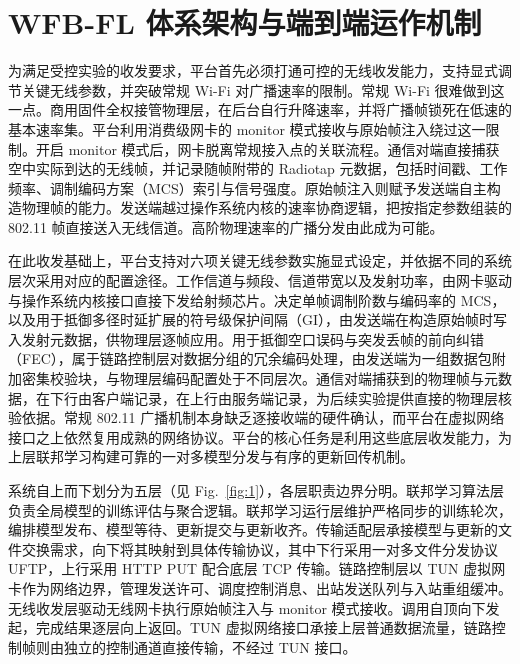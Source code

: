 \section{WFB-FL 体系架构与端到端运作机制}
\label{sec:3}

为满足受控实验的收发要求，平台首先必须打通可控的无线收发能力，支持显式调节关键无线参数，并突破常规 Wi-Fi 对广播速率的限制。常规 Wi-Fi 很难做到这一点。商用固件全权接管物理层，在后台自行升降速率，并将广播帧锁死在低速的基本速率集。平台利用消费级网卡的 monitor 模式接收与原始帧注入绕过这一限制。开启 monitor 模式后，网卡脱离常规接入点的关联流程。通信对端直接捕获空中实际到达的无线帧，并记录随帧附带的 Radiotap 元数据，包括时间戳、工作频率、调制编码方案（MCS）索引与信号强度。原始帧注入则赋予发送端自主构造物理帧的能力。发送端越过操作系统内核的速率协商逻辑，把按指定参数组装的 802.11 帧直接送入无线信道。高阶物理速率的广播分发由此成为可能。

在此收发基础上，平台支持对六项关键无线参数实施显式设定，并依据不同的系统层次采用对应的配置途径。工作信道与频段、信道带宽以及发射功率，由网卡驱动与操作系统内核接口直接下发给射频芯片。决定单帧调制阶数与编码率的 MCS，以及用于抵御多径时延扩展的符号级保护间隔（GI），由发送端在构造原始帧时写入发射元数据，供物理层逐帧应用。用于抵御空口误码与突发丢帧的前向纠错（FEC），属于链路控制层对数据分组的冗余编码处理，由发送端为一组数据包附加密集校验块，与物理层编码配置处于不同层次。通信对端捕获到的物理帧与元数据，在下行由客户端记录，在上行由服务端记录，为后续实验提供直接的物理层核验依据。常规 802.11 广播机制本身缺乏逐接收端的硬件确认，而平台在虚拟网络接口之上依然复用成熟的网络协议。平台的核心任务是利用这些底层收发能力，为上层联邦学习构建可靠的一对多模型分发与有序的更新回传机制。

系统自上而下划分为五层（见 Fig.~\ref{fig:1}），各层职责边界分明。联邦学习算法层负责全局模型的训练评估与聚合逻辑。联邦学习运行层维护严格同步的训练轮次，编排模型发布、模型等待、更新提交与更新收齐。传输适配层承接模型与更新的文件交换需求，向下将其映射到具体传输协议，其中下行采用一对多文件分发协议 UFTP，上行采用 HTTP PUT 配合底层 TCP 传输。链路控制层以 TUN 虚拟网卡作为网络边界，管理发送许可、调度控制消息、出站发送队列与入站重组缓冲。无线收发层驱动无线网卡执行原始帧注入与 monitor 模式接收。调用自顶向下发起，完成结果逐层向上返回。TUN 虚拟网络接口承接上层普通数据流量，链路控制帧则由独立的控制通道直接传输，不经过 TUN 接口。




